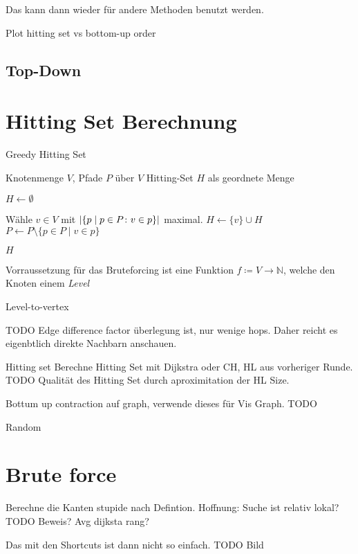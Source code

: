 Das kann dann wieder für andere Methoden benutzt werden.

Plot hitting set vs bottom-up order


\subsection{Top-Down}



\section{Hitting Set Berechnung}

\begin{algorithm}
    \caption{Greedy Hitting Set}
    \begin{algorithmic}[1]
        \Require Knotenmenge $V$, Pfade $P$ über $V$
        \Ensure Hitting-Set $H$ als geordnete Menge

        \State $H \gets \emptyset$

        \State

        \State Wähle $v \in V$ mit $\abs{ \{ p \mid p \in P \colon v \in p \}}$ maximal.
        \State $H \gets \{v\} \cup H$
        \State $P \gets P \setminus \{p \in P \mid v \in p\}$
        \EndWhile

        \State

        \State \Return $H$
    \end{algorithmic}
\end{algorithm}

Vorraussetzung für das Bruteforcing ist eine Funktion $f \coloneq V \to \mathbb{N}$, welche den Knoten einem \emph{Level}

Level-to-vertex

TODO Edge difference factor
überlegung ist, nur wenige hops. Daher reicht es eigenbtlich direkte Nachbarn anschauen.

Hitting set
Berechne Hitting Set mit Dijkstra oder CH, HL aus vorheriger Runde.
TODO Qualität des Hitting Set durch aproximitation der HL Size.

Bottum up contraction auf graph, verwende dieses für Vis Graph.
TODO

Random


\section{Brute force}

Berechne die Kanten stupide nach Defintion. Hoffnung: Suche ist relativ lokal? TODO Beweis? Avg dijksta rang?

Das mit den Shortcuts ist dann nicht so einfach. TODO Bild

